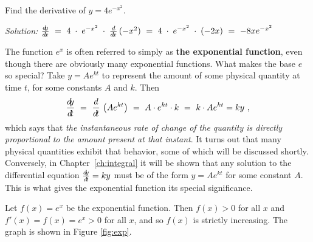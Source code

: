 \begin{exmp}\label{exmp:deriv4ex2}
 Find the derivative of $y = 4e^{-x^2}$.\vspace{1mm}
 \par\noindent\emph{Solution:} $\frac{d\negmedspace y}{d\!x} ~=~ 4 \;\cdot\; e^{-x^2} \;\cdot\; \frac{d}{d\!x}\,(-x^2) ~=~
 4 \;\cdot\; e^{-x^2} \;\cdot\; (-2x) ~=~ -8x e^{-x^2}$
\end{exmp}
\divider
\newpage
The function $e^x$ is often referred to simply as \textbf{the exponential
function}, even though there are obviously many exponential functions. What
makes the base $e$ so special? Take $y = Ae^{kt}$ to represent the amount of
some physical quantity at time $t$, for some constants $A$ and $k$. Then
\begin{displaymath}
 \frac{d\negmedspace y}{d\!t} ~=~ \frac{d}{d\!t}\,\left(Ae^{kt}\right) ~=~ A \cdot e^{kt} \cdot k ~=~ k \cdot Ae^{kt} = ky ~,
\end{displaymath}
which says that \emph{the instantaneous rate of change of the quantity is
directly proportional to the amount present at that instant}. It turns out that
many physical quantities exhibit that behavior, some of which will be discussed
shortly. Conversely, in Chapter~\ref{ch:integral} it will be shown that any solution to the
differential equation
$\frac{d\negmedspace y}{d\!t} = ky$ must be of the form $y = Ae^{kt}$ for some constant $A$. This is
what gives the exponential function its special significance.

Let $f(x) = e^x$ be the exponential function. Then $f(x) > 0$ for all $x$ and
$f'(x) = f(x) = e^x > 0$ for all $x$, and so $f(x)$ is
strictly increasing. The graph is shown in Figure \ref{fig:exp}.

